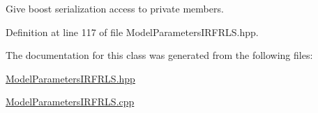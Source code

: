Give boost serialization access to private members. 



Definition at line 117 of file Model\+Parameters\+I\+R\+F\+R\+L\+S.\+hpp.



The documentation for this class was generated from the following files\+:\begin{DoxyCompactItemize}
\item 
\hyperlink{ModelParametersIRFRLS_8hpp}{Model\+Parameters\+I\+R\+F\+R\+L\+S.\+hpp}\item 
\hyperlink{ModelParametersIRFRLS_8cpp}{Model\+Parameters\+I\+R\+F\+R\+L\+S.\+cpp}\end{DoxyCompactItemize}

